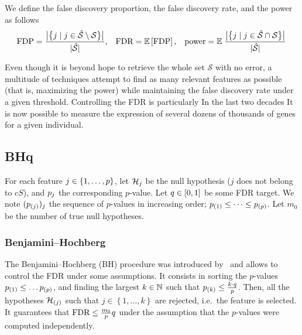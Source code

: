 We define the false discovery proportion, the false discovery rate, and the power as follows
\begin{equation}\label{eq:fdr_def}
        \text{FDP} = \frac
                {\big\lvert\big\{ j \mid j \in \hat{\mathcal{S}} \setminus \mathcal{S} \big\}\big\rvert}
                {\lvert\hat{\mathcal{S}}\rvert}
        \text{,}\quad
        \text{FDR} = {\mathbb E}\left[\text{FDP}\right]
        \text{,}\quad
        \text{power} = {\mathbb E}\left.
                \frac
                {\big\lvert\big\{ j \mid j \in \hat{\mathcal{S}} \cap \mathcal{S} \big\}\big\rvert}
                {\lvert\hat{\mathcal{S}}\rvert}
        \right.
\end{equation}

Even though it is beyond hope to retrieve the whole set $\mathcal{S}$ with no error,
a multitude of techniques attempt to find as many relevant features as possible
(that is, maximizing the power)
while maintaining the false discovery rate under a given threshold.
Controlling the FDR is particularly
In the last two decades
It is now possible to measure the expression of several dozens of thousands of genes for a given individual.

\subsection{BHq}\label{subsec:bhq}

For each feature $j \in \left\{ 1, \dots, p \right\}$, let $\mathcal{H}_j$ be the null hypothesis ($j$ does not belong to $cS$),
and $p_j$ the corresponding $p$-value.
Let $q \in [0, 1]$ be some FDR target.
We note $(p_{(j)})_j$ the sequence of $p$-values in increasing order;
$p_{(1)} \leq \dots \leq p_{(p)}$.
Let $m_0$ be the number of true null hypotheses.

\subsubsection{Benjamini–Hochberg}\label{subsubsec:bh}

The Benjamini–Hochberg (BH) procedure was introduced by~\cite{bh} and allows to control the FDR under some
assumptions.
It consists in sorting the $p$-values $p_{(1)} \leq \dots p_{(p)}$,
and finding the largest $k \in \mathbb{N}$ such that $p_{(k)} \leq \frac{k \cdot q}{p}$.
Then, all the hypotheses $\mathcal{H}_{(j)}$ such that $j \in \left\{ 1, \dots, k \right\}$ are rejected,
i.e.\ the feature is selected.
It guarantees that $\text{FDR} \leq \frac{m_0}{p}q$ under the assumption that the $p$-values were computed
independently.

